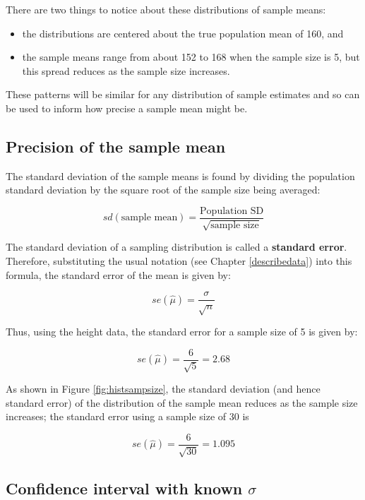 \documentclass[
  oneside]{krantz}
\providecommand{\tightlist}{%
  \setlength{\itemsep}{0pt}\setlength{\parskip}{0pt}}
\begin{document}
There are two things to notice about these distributions of sample means:

\begin{itemize}
\tightlist
\item
  the distributions are centered about the true population mean of 160,
  and
\item
  the sample means range from about 152 to 168 when the sample size is 5, but this spread reduces as the sample size increases.
\end{itemize}

These patterns will be similar for any distribution of sample estimates and so can be used to inform how precise a sample mean might be.

\hypertarget{precision-of-the-sample-mean}{%
\subsection{Precision of the sample mean}\label{precision-of-the-sample-mean}}

The standard deviation of the sample means is found by dividing the population standard deviation by the square root of the sample size being averaged:

\[sd(\textrm{sample mean}) = \frac{\textrm{Population SD}}{\sqrt{\textrm{sample size}}}\]

The standard deviation of a sampling distribution is called a \textbf{standard error}. Therefore, substituting the usual notation (see Chapter \ref{describedata}) into this formula, the standard error of the mean is given by:

\[se(\hat \mu) = \frac{\sigma}{\sqrt{n}}\]

Thus, using the height data, the standard error for a sample size of 5 is given by:

\[se(\hat \mu) = \frac{6}{\sqrt{5}} = 2.68\]

As shown in Figure \ref{fig:histsampsize}, the standard deviation (and hence standard error) of the distribution of the sample mean reduces as the sample size increases; the standard error using a sample size of 30 is

\[se(\hat \mu) = \frac{6}{\sqrt{30}} = 1.095\]

\hypertarget{confidence-interval-with-known-sigma}{%
\subsection{\texorpdfstring{Confidence interval with known \(\sigma\)}{Confidence interval with known \textbackslash sigma}}\label{confidence-interval-with-known-sigma}}
\end{document}
